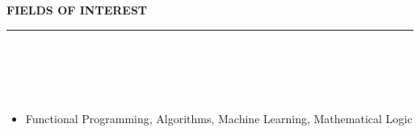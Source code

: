 \documentclass[a4paper,10pt]{article}
\newcommand{\lsep}{-0.5cm}
\newcommand{\resheading}[1]{{\small
        {
            \begin{minipage}
                {0.975\textwidth}\textbf{{\textsc{#1 \vphantom{p\^{E}} }}}
                \\[-0.3cm]
                \hrule
            \end{minipage}
            \\[-0.5cm]
        }
 }}
\begin{document}

\resheading{\textbf{\large FIELDS OF INTEREST}}\\[\lsep] \\[-0.4cm]
 \begin{itemize}
     \item Functional Programming, Algorithms, Machine Learning, Mathematical Logic
 \end{itemize}
\vspace{0.5cm}
\end{document}
